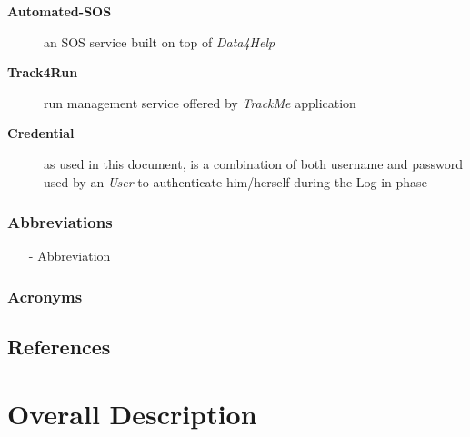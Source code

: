 \documentclass[a4paper]{article}
\begin{document}
\begin{description}
                    \item[\textbf{Automated-SOS}] an SOS service built on top of \textit{Data4Help}
                    
                    \item[\textbf{Track4Run}] run management service offered by \textit{TrackMe} application
                    
                    \item[\textbf{Credential}] as used in this document, is a combination of both username and password used by an \textit{User} to authenticate him/herself during the Log-in phase
                \end{description}
                
            \subsubsection{Abbreviations}
            \begin{itemize}
                \item[-] Abbreviation 
            \end{itemize}
            
            \subsubsection{Acronyms}
            \begin{acronym}
            \end{acronym}
            
    \subsection{References}
        \printbibliography[heading=none]
\newpage
\section{Overall Description}
\end{document}
